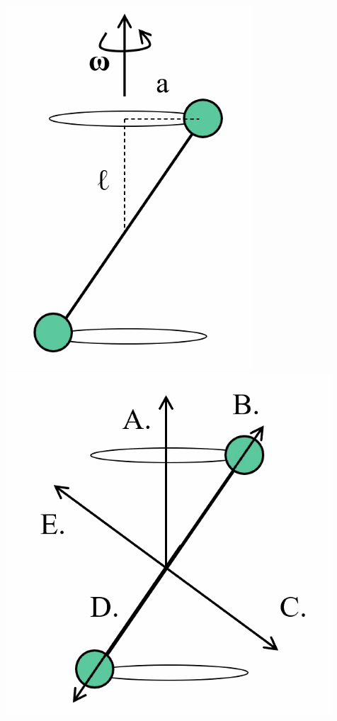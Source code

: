 \documentclass[../PHYS306Notes.tex]{subfiles}
\begin{document}
\begin{center}
    \includegraphics[scale=0.5]{Lecture-18/l18-img1.png}
    \includegraphics[scale=0.5]{Lecture-18/l18-img2.png}
\end{center}
\end{document}
